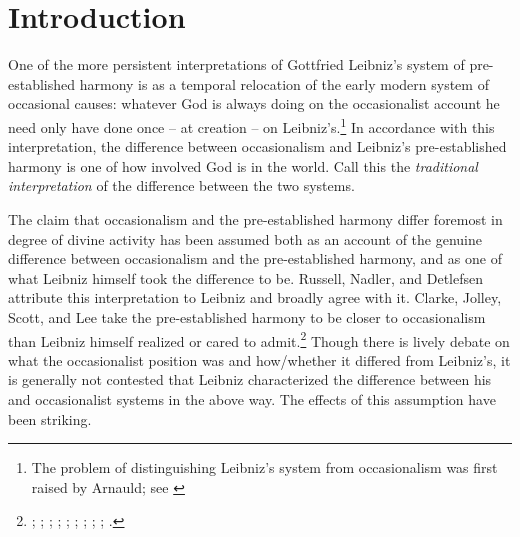 \documentclass{article}
\begin{document}
\section{Introduction}
One of the more persistent interpretations of Gottfried Leibniz's system of pre-established harmony is as a temporal relocation of the early modern system of occasional causes: whatever God is always doing on the occasionalist account he need only have done once -- at creation -- on Leibniz's.\footnote{The problem of distinguishing Leibniz's system from occasionalism was first raised by Arnauld; see \autocite[vol. II, 84-90]{GP}} In accordance with this interpretation, the difference between occasionalism and Leibniz's pre-established harmony is one of how involved God is in the world. Call this the \emph{traditional interpretation} of the difference between the two systems.%

The claim that occasionalism and the pre-established harmony differ foremost in degree of divine activity has been assumed both as an account of the genuine difference between occasionalism and the pre-established harmony, and as one of what Leibniz himself took the difference to be. Russell, Nadler, and Detlefsen attribute this interpretation to Leibniz and broadly agree with it. Clarke, Jolley, Scott, and Lee take the pre-established harmony to be closer to occasionalism than Leibniz himself realized or cared to admit.\footnote{\autocite{Russell1951}; \autocite[31-32]{Nadler1993}; \autocite[449]{Detlefsen2003}; \autocite[121]{Clarke1989}; \autocite{Clarke1995}; \autocite{Scott1997}; \autocite[246]{Jolley2002}; \autocite[106-107]{Jolley1990}; \autocite[39]{Black1997}; \autocite[230]{Lee2004}.} Though there is lively debate on what the occasionalist position was and how/whether it differed from Leibniz's, it is generally not contested that Leibniz characterized the difference between his and occasionalist systems in the above way. The effects of this assumption have been striking.
\end{document}
